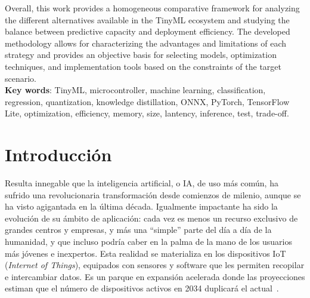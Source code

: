 \documentclass[a4paper,12pt,twoside,final]{book}
\begin{document}
Overall, this work provides a homogeneous comparative framework for analyzing the different alternatives available in
the TinyML ecosystem and studying the balance between predictive capacity and deployment efficiency. The developed
methodology allows for characterizing the advantages and limitations of each strategy and provides an objective basis
for selecting models, optimization techniques, and implementation tools based on the constraints of the target scenario.\\

\textbf{Key words}: TinyML, microcontroller, machine learning, classification, regression, quantization,
knowledge distillation, ONNX, PyTorch, TensorFlow Lite, optimization, efficiency, memory, size, lantency, inference,
test, trade-off.

\begingroup
\sloppy %
\tableofcontents
\endgroup

\cleardoublepage

\listoffigures
\listoftables
\lstlistoflistings
\cleardoublepage

\mainmatter

\chapter{Introducción}
Resulta innegable que la inteligencia artificial, o IA, de uso más común, ha sufrido una revolucionaria
transformación desde comienzos de milenio, aunque se ha visto agigantada en la última década. Igualmente
impactante ha sido la evolución de su ámbito de aplicación: cada vez es menos un recurso exclusivo de grandes
centros y empresas, y más una ``simple'' parte del día a día de la humanidad, y que incluso podría caber en la
palma de la mano de los usuarios más jóvenes e inexpertos. Esta realidad se materializa en los dispositivos
IoT (\textit{Internet of Things}), equipados con sensores y software que les permiten recopilar e
intercambiar datos. Es un parque en expansión acelerada donde las proyecciones estiman que el número de
dispositivos activos en 2034 duplicará el actual~\cite{taylor2026statista}.\\
\end{document}
